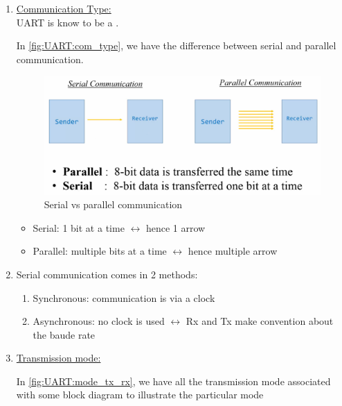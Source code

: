 \documentclass[12pt,a4paper]{book}
\begin{document}
\begin{enumerate}

\item  \underline{Communication Type:}\\

UART is know to be a .

In \autoref{fig:UART:com_type}, we have the difference between serial and parallel communication.

\begin{figure}[h]
\centering
\includegraphics[scale=0.3,frame]{Figures/UART/com_type}
\caption{Serial vs parallel communication}
\label{fig:UART:com_type}
\end{figure}

\begin{itemize}

\item  Serial: 1 bit at a time $\leftrightarrow$ hence 1 arrow

\item  Parallel: multiple bits at a time $\leftrightarrow$ hence multiple arrow

\end{itemize}

\item Serial communication comes in 2 methods:

    \begin{enumerate}
    \item Synchronous: communication is via a clock

    \item  Asynchronous: no clock is used $\leftrightarrow$ Rx and Tx make convention about the baude rate
    
    \end{enumerate}

\item \underline{Transmission mode:}

In \autoref{fig:UART:mode_tx_rx}, we have all the transmission mode associated with some block diagram to illustrate the particular mode


\end{enumerate}
\end{document}

